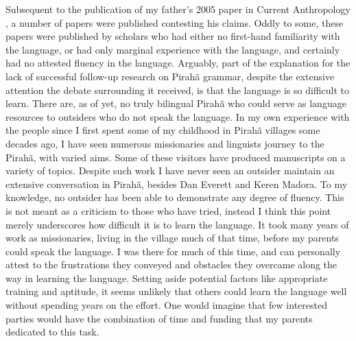 \documentclass[output=paper,colorlinks,citecolor=brown
]{langscibook}
\begin{document}
    Subsequent to the publication of my father’s 2005 paper in Current Anthropology \citep{everett2005cultural}, a number of papers were published contesting his claims. Oddly to some, these papers were published by scholars who had either no first-hand familiarity with the language, or had only marginal experience with the language, and certainly had no attested fluency in the language. Arguably, part of the explanation for the lack of successful follow-up research on Pirahã grammar, despite the extensive attention the debate surrounding it received, is that the language is so difficult to learn. There are, as of yet, no truly bilingual Pirahã who could serve as language resources to outsiders who do not speak the language. In my own experience with the people since I first spent some of my childhood in Pirahã villages some decades ago, I have seen numerous missionaries and linguists journey to the Pirahã, with varied aims. Some of these visitors have produced manuscripts on a variety of topics. Despite such work I have never seen an outsider maintain an extensive conversation in Pirahã, besides Dan Everett and Keren Madora. To my knowledge, no outsider has been able to demonstrate any degree of fluency. This is not meant as a criticism to those who have tried, instead I think this point merely underscores how difficult it is to learn the language. It took many years of work as missionaries, living in the village much of that time, before my parents could speak the language. I was there for much of this time, and can personally attest to the frustrations they conveyed and obstacles they overcame along the way in learning the language. Setting aside potential factors like appropriate training and aptitude, it seems unlikely that others could learn the language well without spending years on the effort. One would imagine that few interested parties would have the combination of time and funding that my parents dedicated to this task.
    
\end{document}
